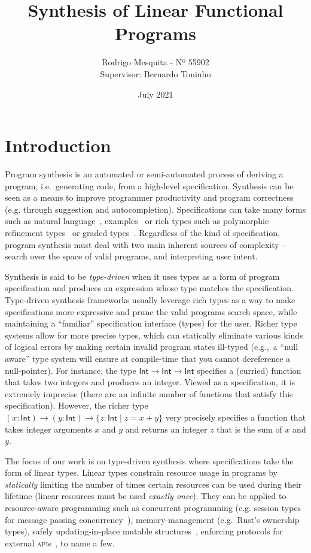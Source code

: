 \documentclass{llncs}
\title{Synthesis of Linear Functional Programs}
\author{Rodrigo Mesquita - Nº 55902 \\
    Supervisor: Bernardo Toninho}
\date{July 2021}
\institute{NOVA School of Science and Technology}
\begin{document}
\maketitle

\section{Introduction}

Program synthesis is an automated or semi-automated process of deriving a
program, i.e.~generating code, from a high-level specification. Synthesis can be
seen as a means to improve programmer productivity and program correctness
(e.g. through suggestion and autocompletion).
%
Specifications can take many forms such as natural
language~\cite{chen2021evaluating},
examples~\cite{DBLP:conf/popl/FrankleOWZ16} or rich types such as
polymorphic refinement types~\cite{DBLP:conf/pldi/PolikarpovaKS16} or
graded types~\cite{DBLP:conf/lopstr/HughesO20}. Regardless of the kind
of specification, program synthesis must deal with two main
inherent sources of complexity -- search over the space of
valid programs, and interpreting user intent.

Synthesis is said to be \emph{type-driven} when it uses types as a form of program
specification and produces an expression whose type matches the specification.
Type-driven synthesis frameworks usually leverage rich types as a way to make
specifications more expressive and prune the valid programs search space, while
maintaining a ``familiar'' specification interface (types) for the user.
%
Richer type systems allow for more precise types, which can statically eliminate
various kinds of logical errors by making certain invalid program states
ill-typed (e.g.,~a ``null aware'' type system will ensure at compile-time that
you cannot dereference a null-pointer).
%
For instance, the type $\mathsf{Int} \rightarrow \mathsf{Int} \rightarrow
\mathsf{Int}$ specifies a (curried) function that takes two integers and
produces an integer. Viewed as a specification, it is extremely imprecise (there
are an infinite number of functions that satisfy this specification).  However,
the richer type $(x{:}\mathsf{Int}) \rightarrow (y{:}\mathsf{Int}) \rightarrow
\{z{:}\mathsf{Int} \mid z = x+y\}$ very precisely specifies a function that
takes integer arguments $x$ and $y$ and returns an integer $z$ that is the sum
of $x$ and $y$.

The focus of our work is on type-driven synthesis where specifications take the
form of linear types.
Linear types constrain resource
usage in programs by \emph{statically} limiting the number of times certain
resources can be used during their lifetime (linear resources must be used
\emph{exactly once}).
%
They can be applied to resource-aware programming such as concurrent programming
(e.g. session types for message passing
concurrency~\cite{DBLP:journals/mscs/CairesPT16}), memory-management
(e.g.~Rust's ownership types), safely updating-in-place mutable
structures~\cite{Bernardy_2018}, enforcing protocols for external \textsc{api}s~\cite{Bernardy_2018}, to name a few.
\end{document}
